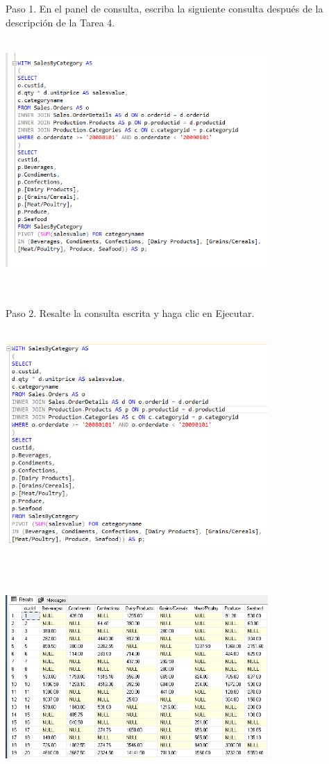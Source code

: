 \begin{flushleft}
Paso 1. En el panel de consulta, escriba la siguiente consulta después de la descripción de la Tarea 4.
\textbf{}\\
\textbf{}\\
\begin{center}
	\includegraphics[width=10cm]{./Imagenes/4img1}
	\end{center}
\textbf{}\\
\textbf{}\\
Paso 2. Resalte la consulta escrita y haga clic en Ejecutar.
\textbf{}\\
\textbf{}\\
\begin{center}
	\includegraphics[width=10cm]{./Imagenes/4img2}
	\end{center}
\textbf{}\\
\textbf{}\\
\begin{center}
	\includegraphics[width=10cm]{./Imagenes/4img3}
	\end{center}








\end{flushleft}